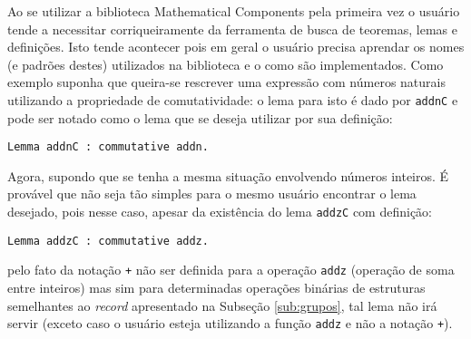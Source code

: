 Ao se utilizar a biblioteca Mathematical Components pela primeira vez o usuário tende a necessitar corriqueiramente da ferramenta de busca de teoremas, lemas e definições. Isto tende acontecer pois em geral o usuário precisa aprendar os nomes (e padrões destes) utilizados na biblioteca e o como são implementados. Como exemplo suponha que queira-se rescrever uma expressão com números naturais utilizando a propriedade de comutatividade: o lema para isto é dado por \lstinline[language = coq]!addnC! e pode ser notado como o lema que se deseja utilizar por sua definição:
\begin{lstlisting}[language=coq]
        Lemma addnC : commutative addn.
\end{lstlisting}
Agora, supondo que se tenha a mesma situação envolvendo números inteiros. É provável que não seja tão simples para o mesmo usuário encontrar o lema desejado, pois nesse caso, apesar da existência do lema \lstinline[language = coq]!addzC! com definição:
\begin{lstlisting}[language=coq]
        Lemma addzC : commutative addz.
\end{lstlisting}
pelo fato da notação \lstinline[language = coq]!+! não ser definida para a operação \lstinline[language = coq]!addz! (operação de soma entre inteiros) mas sim para determinadas operações binárias de estruturas semelhantes ao \textit{record} apresentado na Subseção \ref{sub:grupos}, tal lema não irá servir (exceto caso o usuário esteja utilizando a função \lstinline[language = coq]!addz! e não a notação \lstinline[language = coq]!+!).


